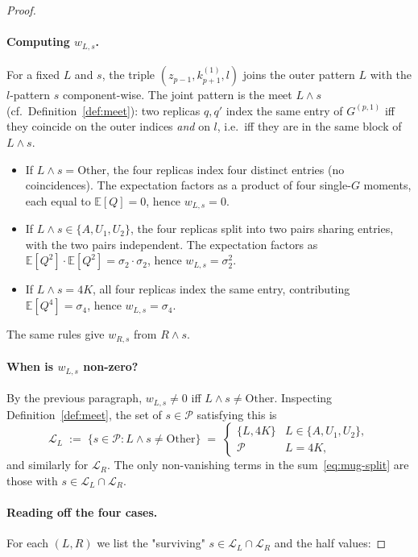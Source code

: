 \documentclass[12pt,a4paper]{article}
\begin{document}
\begin{proof}
\paragraph{Computing $w_{L,s}$.}
For a fixed $L$ and $s$, the triple $(z_{p-1}, k^{(1)}_{p+1}, l)$ joins 
the outer pattern $L$ with the $l$-pattern $s$ component-wise. The 
joint pattern is the meet $L \wedge s$ (cf.\ Definition~\ref{def:meet}): 
two replicas $q, q'$ index the same entry of $G^{(p,1)}$ iff they 
coincide on the outer indices \emph{and} on $l$, i.e.\ iff they are in 
the same block of $L \wedge s$.
\begin{itemize}
  \item If $L \wedge s = \mathrm{Other}$, the four replicas index four 
        distinct entries (no coincidences). The expectation factors as 
        a product of four single-$G$ moments, each equal to 
        $\mathbb{E}[Q] = 0$, hence $w_{L,s} = 0$.
  \item If $L \wedge s \in \{A, U_{1}, U_{2}\}$, the four replicas split 
        into two pairs sharing entries, with the two pairs independent. 
        The expectation factors as $\mathbb{E}[Q^{2}] \cdot \mathbb{E}[Q^{2}] = \sigma_{2} \cdot \sigma_{2}$, hence $w_{L,s} = \sigma_{2}^{2}$.
  \item If $L \wedge s = 4K$, all four replicas index the same entry, 
        contributing $\mathbb{E}[Q^{4}] = \sigma_{4}$, hence $w_{L,s} = \sigma_{4}$.
\end{itemize}
The same rules give $w_{R,s}$ from $R \wedge s$.

\paragraph{When is $w_{L,s}$ non-zero?}
By the previous paragraph, $w_{L,s} \ne 0$ iff $L \wedge s \ne \mathrm{Other}$. 
Inspecting Definition~\ref{def:meet}, the set of $s \in \mathcal{P}$ satisfying 
this is
\[
\mathcal{L}_{L} \;:=\; \{s \in \mathcal{P} : L \wedge s \ne \mathrm{Other}\}
\;=\;
\begin{cases}
\{L, 4K\} & L \in \{A, U_{1}, U_{2}\}, \\
\mathcal{P} & L = 4K,
\end{cases}
\]
and similarly for $\mathcal{L}_{R}$. The only non-vanishing terms in 
the sum~\eqref{eq:mug-split} are those with $s \in \mathcal{L}_{L} \cap \mathcal{L}_{R}$.

\paragraph{Reading off the four cases.}
For each $(L,R)$ we list the "surviving" $s\in\mathcal L_{L}\cap\mathcal L_{R}$ and the half values:


\end{proof}
\end{document}
